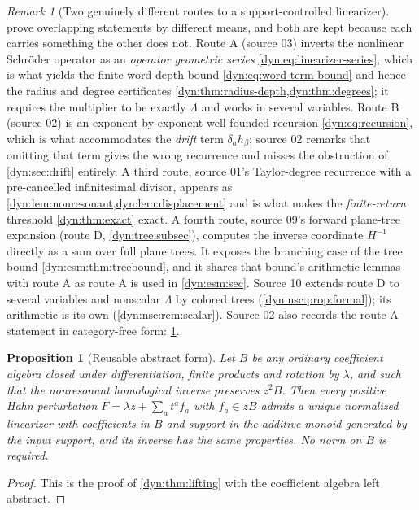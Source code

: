 \documentclass[11pt,letterpaper]{article}
\newtheorem{proposition}[proposition]{Proposition}
\theoremstyle{definition}
\theoremstyle{remark}
\newtheorem{remark}[remark]{Remark}
\numberwithin{equation}{section}
\begin{document}
\begin{remark}[Two genuinely different routes to a support-controlled linearizer]
\label{dyn:rem:tworoutes-lin}
 prove overlapping statements
by different means, and both are kept because each carries something the
other does not. Route A (source 03) inverts the nonlinear Schr\"oder
operator as an \emph{operator geometric series}
\eqref{dyn:eq:linearizer-series}, which is what yields the finite
word-depth bound \eqref{dyn:eq:word-term-bound} and hence the radius and
degree certificates \cref{dyn:thm:radius-depth,dyn:thm:degrees}; it
requires the multiplier to be exactly $\Lambda$ and works in several
variables. Route B (source 02) is an exponent-by-exponent well-founded
recursion \eqref{dyn:eq:recursion}, which is what accommodates the
\emph{drift} term $\delta_ah_\beta$; source 02 remarks that omitting that
term gives the wrong recurrence and misses the obstruction of
\cref{dyn:sec:drift} entirely. A third route, source 01's Taylor-degree
recurrence with a pre-cancelled infinitesimal divisor, appears as
\cref{dyn:lem:nonresonant,dyn:lem:displacement} and is what makes the
\emph{finite-return} threshold \cref{dyn:thm:exact} exact. A fourth route,
source 09's forward plane-tree expansion (route D,
\cref{dyn:tree:subsec}), computes the inverse coordinate $H^{-1}$ directly
as a sum over full plane trees. It exposes the branching case of the tree
bound \cref{dyn:esm:thm:treebound}, and it shares that bound's arithmetic
lemmas with route A as route A is used in \cref{dyn:esm:sec}. Source 10
extends route D to several variables and nonscalar $\Lambda$ by colored
trees (\cref{dyn:nsc:prop:formal}); its arithmetic is its own
(\cref{dyn:nsc:rem:scalar}). Source 02 also
records the route-A statement in category-free form:
\cref{dyn:prop:reusable}.
\end{remark}

\begin{proposition}[Reusable abstract form]\label{dyn:prop:reusable}
Let $B$ be any ordinary coefficient algebra closed under differentiation,
finite products and rotation by $\lambda$, and such that the nonresonant
homological inverse preserves $z^{2}B$. Then every positive Hahn
perturbation $F=\lambda z+\sum_at^{a}f_a$ with $f_a\in zB$ admits a unique
normalized linearizer with coefficients in $B$ and support in the additive
monoid generated by the input support, and its inverse has the same
properties. No norm on $B$ is required.
\end{proposition}
\begin{proof}
This is the proof of \cref{dyn:thm:lifting} with the coefficient algebra
left abstract.
\end{proof}
\end{document}
